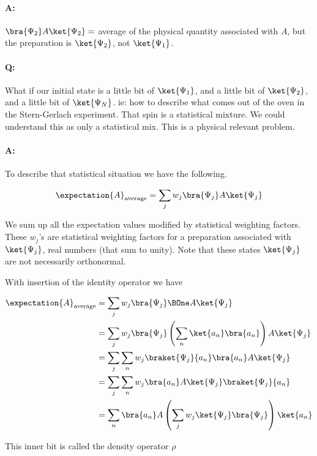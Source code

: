 \paragraph{A:}  $\bra{\Psi_2} A \ket{\Psi_2} = $ average of the physical quantity associated with $A$, but the preparation is $\ket{\Psi_2}$, not $\ket{\Psi_1}$.

\paragraph{Q:}  What if our initial state is a little bit of $\ket{\Psi_1}$, and a little bit of $\ket{\Psi_2}$, and a little bit of $\ket{\Psi_N}$.  ie: how to describe what comes out of the oven in the Stern-Gerlach experiment.  That spin is a statistical mixture.  We could understand this as only a statistical mix.  This is a physical relevant problem.
\paragraph{A:}  To describe that statistical situation we have the following.

\begin{align}\label{eqn:PHY356HNov2:30}
\expectation{A}_{\text{average}} = \sum_j w_j \bra{\Psi_j} A \ket{\Psi_j}
\end{align}

We sum up all the expectation values modified by statistical weighting factors.  These $w_j$'s are statistical weighting factors for a preparation associated with $\ket{\Psi_j}$, real numbers (that sum to unity).  Note that these states $\ket{\Psi_j}$ are not necessarily orthonormal.

With insertion of the identity operator we have

\begin{align*}
\expectation{A}_{\text{average}}
&= \sum_j w_j \bra{\Psi_j} \BOne A \ket{\Psi_j} \\
&= \sum_j w_j \bra{\Psi_j} \left( \sum_n \ket{a_n} \bra{a_n} \right) A \ket{\Psi_j} \\
&= \sum_j \sum_n w_j \braket{\Psi_j}{a_n} \bra{a_n} A \ket{\Psi_j} \\
&= \sum_j \sum_n w_j \bra{a_n} A \ket{\Psi_j} \braket{\Psi_j}{a_n}  \\
&= \sum_n \bra{a_n} A \left( \sum_j w_j \ket{\Psi_j} \bra{\Psi_j} \right) \ket{a_n}  \\
\end{align*}

This inner bit is called the density operator $\rho$

